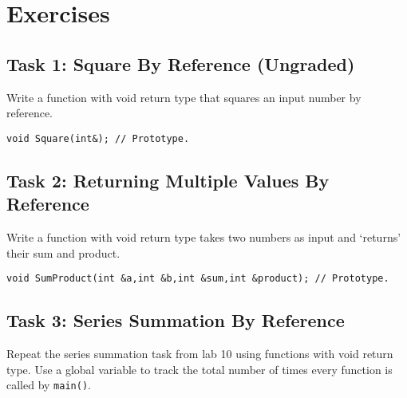 \documentclass[12pt,a4paper]{article}
\begin{document}
\section{Exercises}
\subsection{Task 1: Square By Reference (Ungraded)} Write a function with void return type that squares an input number by reference.
\begin{lstlisting}[caption={Square by reference}]
void Square(int&); // Prototype.
\end{lstlisting}
\subsection{Task 2: Returning Multiple Values By Reference} Write a function with void return type takes two numbers as input and `returns' their sum and product.
\begin{lstlisting}[caption={Sum and Product by reference}]
void SumProduct(int &a,int &b,int &sum,int &product); // Prototype.
\end{lstlisting}
\subsection{Task 3: Series Summation By Reference} Repeat the series summation task from lab 10 using functions with void return type. Use a global variable to track the total number of times every function is called by \verb|main()|.
\end{document}
